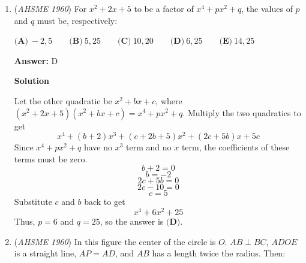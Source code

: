 \begin{enumerate}
 $\textbf{(A)}\ \text{none of the quadrants}\qquad\textbf{(B)}\ \text{quadrant I only}\qquad\textbf{(C)}\ \text{quadrants I, II only}\qquad$
$\textbf{(D)}\ \text{quadrants I, II, III only}\qquad\textbf{(E)}\ \text{each of the quadrants}$

 \textbf{Answer: }C



\textbf{Solution}

If a point is equidistant from the coordinate axes, then the absolute values of the x-coordinate and y-coordinate are equal.  Since the point is on the line $3x+5y=15$, find the intersection point of $y=x$ and $3x+5y=15$ and the intersection point of $y=-x$ and $3x+5y=15$.

 Substituting $x$ for $y$ in $3x+5y=15$ results in $8x=15$, so $x=\frac{15}{8}$.  That means $y=\frac{15}{8}$, so one of the points is in the first quadrant.

 Substituting $-x$ and $y$ in $3x+5y=15$ results in $-2x=15$, so $x=\frac{-15}{2}$.  That means $y=\frac{15}{2}$, so the other point is in the second quadrant.

 Thus, the points are in quadrants $I$ and $II$, so the answer is $\boxed{\textbf{(C)}}$.

 


	\item (\textit{AHSME 1960}) For $x^2+2x+5$ to be a factor of $x^4+px^2+q$, the values of $p$ and $q$ must be, respectively:


 $\textbf{(A)}\ -2, 5\qquad \textbf{(B)}\ 5, 25\qquad \textbf{(C)}\ 10, 20\qquad \textbf{(D)}\ 6, 25\qquad \textbf{(E)}\ 14, 25$

 \textbf{Answer: }D



\textbf{Solution}

Let the other quadratic be $x^2 + bx + c$, where $(x^2 + 2x + 5)(x^2 + bx + c) = x^4 + px^2 + q$.  Multiply the two quadratics to get
 \[x^4 + (b+2)x^3 + (c + 2b + 5)x^2 + (2c + 5b)x + 5c\]Since $x^4 + px^2 + q$ have no $x^3$ term and no $x$ term, the coefficients of these terms must be zero.
 \[b+2=0\]
 \[b=-2\]
 \[2c+5b=0\]
 \[2c-10=0\]
 \[c=5\]Substitute $c$ and $b$ back to get
 \[x^4 + 6x^2 + 25\]Thus, $p=6$ and $q=25$, so the answer is $\boxed{\textbf{(D)}}$.

 


	\item (\textit{AHSME 1960}) In this figure the center of the circle is $O$. $AB \perp BC$, $ADOE$ is a straight line, $AP = AD$, and $AB$ has a length twice the radius. Then:



\end{enumerate}
